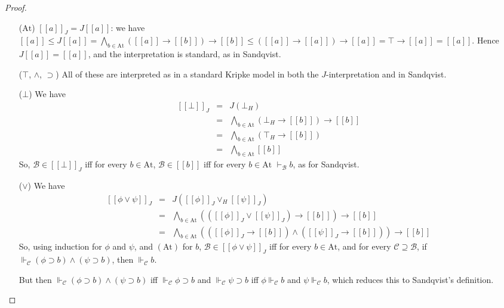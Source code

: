\documentclass{sn-jnl}
\newcommand{\todo}[1]{\textcolor{red} {[todo: {#1}]}}
\newcommand{\At}{\text{At}}
\newcommand{\derives}[1]{\vdash_{\!#1}}
\newcommand{\base}[1]{\mathscr{#1}}
\renewcommand{\derives}[2]{\vdash_{\base{#1}}#2}
\newcommand{\support}[2]{\Vdash_{\base{#1}}#2}
\newcommand{\db}[1]{[\![#1]\!]}
\begin{document}
\begin{proof}
\begin{itemize}[align=left]
    \item[($\At$)] $\db{a}_J = J \db{a}$: we have $\db{a} \leq J \db{a} = \bigwedge_{b\in\At} (\db{a}\to \db{b})\to \db{b} \leq (\db{a}\to \db{a}) \to \db{a} = \top\to \db{a} = \db{a}$. Hence $J \db{a} = \db{a}$, and the interpretation is standard, as in Sandqvist. \vspace{1mm} 
    \item[($\top$, $\wedge$, $\supset$)] All of these are interpreted as in a standard Kripke model in both the $J$-interpretation and in Sandqvist. \vspace{1mm}
    \item[($\bot$)] We have 
    \[
    \begin{array}{rcl} 
    \db{\bot}_J & = & J (\bot_H) \\ 
                & = & \bigwedge_{b\in\At} (\bot_H\to \db{b})\to \db{b} \\
                & = & \bigwedge_{b\in\At} (\top_H \to \db{b}) \\ 
                & = & \bigwedge_{b\in\At} \db{b}
    \end{array}
    \]
    So, $\base{B}\in\db{\bot}_J$ iff for every $b\in\At$, $\base{B}\in\db{b}$ iff for every $b\in\At$ $\derives{B}{b}$, as for Sandqvist. \vspace{1mm}
    \item[($\vee$)] We have 
    \[
    \begin{array}{rcl} 
    \db{\phi\vee\psi}_J & = & J(\db{\phi}_J\vee_H\db{\psi}_J) \\ 
    & = &\bigwedge_{b\in\At} ((\db{\phi}_J \vee \db{\psi}_J)\to \db{b})\to \db{b} \\ 
    & = & \bigwedge_{b\in\At} ((\db{\phi}_J\to \db{b})\wedge(\db{\psi}_J\to \db{b}))\to \db{b} 
    \end{array}
    \]
    So, using induction for $\phi$ and $\psi$, and $(\At)$ for $b$, $\base{B}\in\db{\phi\vee\psi}_J$ iff for every $b\in\At$, and for every $\base{C}\supseteq\base{B}$, if 
    $\support{C}{({\phi}\supset  {b})\wedge({\psi} \supset  {b})}$, then $\support{C}{{b}}$. 

    \medskip
    
    \noindent But then $\support{C}{({\phi}\supset  {b})\wedge({\psi} \supset {b})}$ iff 
    $\support{C}{{\phi} \supset {b}}$ and $\support{C}{{\psi} \supset {b}}$
    iff ${\phi}\support{C}{{b}}$ and ${\psi}\support{C}{{b}}$, which reduces this to Sandqvist's definition. 
\end{itemize} \vspace{-4mm}
\end{proof}
\end{document}
